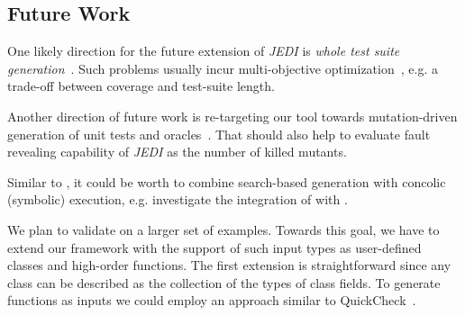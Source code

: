 
\subsection{Future Work}
\label{subsec.fut.work}

One likely direction for the future extension of \emph{JEDI} is \emph{whole test suite generation}~\cite{fraser2013whole}. Such problems usually incur multi-objective optimization~\cite{lakhotia2007multi,panichella2017lips}, e.g. a trade-off between coverage and test-suite length.

Another direction of future work is re-targeting our tool towards mutation-driven generation of unit tests and oracles~\cite{fraser2012mutation}. That should also help to evaluate fault revealing capability of \emph{JEDI} as the number of killed mutants.

Similar to \cite{baars2011symbolic, galeotti2013improving}, it could be worth to combine search-based generation with concolic (symbolic) execution, e.g. investigate the integration of \Jedi with \Jalangi.

We plan to validate \Jedi on a larger set of examples. Towards this goal, we have to extend our framework with the support of such input types as user-defined classes and high-order functions. The first extension is straightforward since any class can be described as the collection of the types of class fields. To generate functions as inputs we could employ an approach similar to QuickCheck~\cite{koopman2006automatic}.

